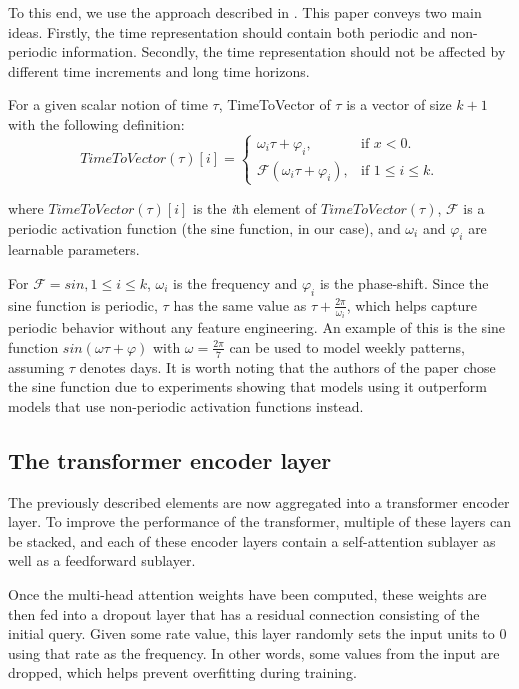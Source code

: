 To this end, we use the approach described in \citet{time2vec}. 
This paper conveys two main ideas.
Firstly, the time representation should contain both periodic and non-periodic information.
Secondly, the time representation should not be affected by different time increments and long time horizons.  

For a given scalar notion of time $\tau$, TimeToVector of $\tau$ is a vector of size $k + 1$ with the following definition:
$$
TimeToVector(\tau)[i] = 
\begin{cases}
  \omega_i \tau + \varphi_i, & \mbox{if $x<0$}.\\
  \mathcal{F}(\omega_i \tau + \varphi_i), & \mbox{if $1 \le i \le k$}.
\end{cases}
$$

where $TimeToVector(\tau)[i]$ is the \textit{i}th element of $TimeToVector(\tau)$, $\mathcal{F}$ is a periodic activation function (the sine function, in our case), and $\omega_i$ and $\varphi_i$ are learnable parameters. 

For $\mathcal{F} = sin, 1 \leq i \leq k$, $\omega_i$ is the frequency and $\varphi_i$ is the phase-shift.
Since the sine function is periodic, $\tau$ has the same value as $\tau + \frac{2\pi}{\omega_i}$, which helps capture periodic behavior without any feature engineering.
An example of this is the sine function $sin(\omega\tau + \varphi)$ with $\omega = \frac{2\pi}{7}$ can be used to model weekly patterns, assuming $\tau$ denotes days.
It is worth noting that the authors of the paper chose the sine function due to experiments showing that models using it outperform models that use non-periodic activation functions instead.\cite{time2vec}


\subsection{The transformer encoder layer}\label{sec:transformer encoder}
The previously described elements are now aggregated into a transformer encoder layer.
To improve the performance of the transformer, multiple of these layers can be stacked, and each of these encoder layers contain a self-attention sublayer as well as a feedforward sublayer. 

Once the multi-head attention weights have been computed, these weights are then fed into a dropout layer that has a residual connection consisting of the initial query.
Given some rate value, this layer randomly sets the input units to 0 using that rate as the frequency.
In other words, some values from the input are dropped, which helps prevent overfitting during training.

